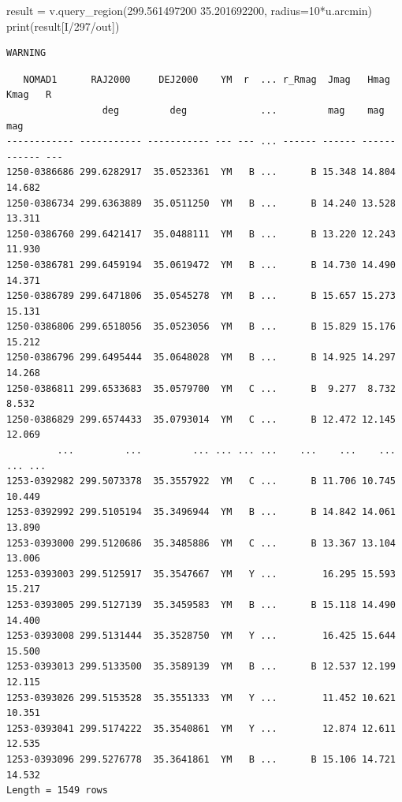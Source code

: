 \documentclass[
  letterpaper,
  DIV=11,
  numbers=noendperiod]{scrreprt}
\newenvironment{Shaded}{\begin{snugshade}}{\end{snugshade}}
\newcommand{\BuiltInTok}[1]{\textcolor[rgb]{0.00,0.23,0.31}{#1}}
\newcommand{\DecValTok}[1]{\textcolor[rgb]{0.68,0.00,0.00}{#1}}
\newcommand{\NormalTok}[1]{\textcolor[rgb]{0.00,0.23,0.31}{#1}}
\newcommand{\OperatorTok}[1]{\textcolor[rgb]{0.37,0.37,0.37}{#1}}
\newcommand{\StringTok}[1]{\textcolor[rgb]{0.13,0.47,0.30}{#1}}
\begin{document}
\begin{Shaded}
\begin{Highlighting}[]
\NormalTok{result }\OperatorTok{=}\NormalTok{ v.query\_region(}\StringTok{\textquotesingle{}299.561497200  35.201692200\textquotesingle{}}\NormalTok{, radius}\OperatorTok{=}\DecValTok{10}\OperatorTok{*}\NormalTok{u.arcmin)}
\BuiltInTok{print}\NormalTok{(result[}\StringTok{\textquotesingle{}I/297/out\textquotesingle{}}\NormalTok{])}
\end{Highlighting}
\end{Shaded}

\begin{verbatim}
WARNING
\end{verbatim}

\begin{verbatim}
   NOMAD1      RAJ2000     DEJ2000    YM  r  ... r_Rmag  Jmag   Hmag   Kmag   R 
                 deg         deg             ...         mag    mag    mag      
------------ ----------- ----------- --- --- ... ------ ------ ------ ------ ---
1250-0386686 299.6282917  35.0523361  YM   B ...      B 15.348 14.804 14.682    
1250-0386734 299.6363889  35.0511250  YM   B ...      B 14.240 13.528 13.311    
1250-0386760 299.6421417  35.0488111  YM   B ...      B 13.220 12.243 11.930    
1250-0386781 299.6459194  35.0619472  YM   B ...      B 14.730 14.490 14.371    
1250-0386789 299.6471806  35.0545278  YM   B ...      B 15.657 15.273 15.131    
1250-0386806 299.6518056  35.0523056  YM   B ...      B 15.829 15.176 15.212    
1250-0386796 299.6495444  35.0648028  YM   B ...      B 14.925 14.297 14.268    
1250-0386811 299.6533683  35.0579700  YM   C ...      B  9.277  8.732  8.532    
1250-0386829 299.6574433  35.0793014  YM   C ...      B 12.472 12.145 12.069    
         ...         ...         ... ... ... ...    ...    ...    ...    ... ...
1253-0392982 299.5073378  35.3557922  YM   C ...      B 11.706 10.745 10.449    
1253-0392992 299.5105194  35.3496944  YM   B ...      B 14.842 14.061 13.890    
1253-0393000 299.5120686  35.3485886  YM   C ...      B 13.367 13.104 13.006    
1253-0393003 299.5125917  35.3547667  YM   Y ...        16.295 15.593 15.217    
1253-0393005 299.5127139  35.3459583  YM   B ...      B 15.118 14.490 14.400    
1253-0393008 299.5131444  35.3528750  YM   Y ...        16.425 15.644 15.500    
1253-0393013 299.5133500  35.3589139  YM   B ...      B 12.537 12.199 12.115    
1253-0393026 299.5153528  35.3551333  YM   Y ...        11.452 10.621 10.351    
1253-0393041 299.5174222  35.3540861  YM   Y ...        12.874 12.611 12.535    
1253-0393096 299.5276778  35.3641861  YM   B ...      B 15.106 14.721 14.532    
Length = 1549 rows
\end{verbatim}
\end{document}
